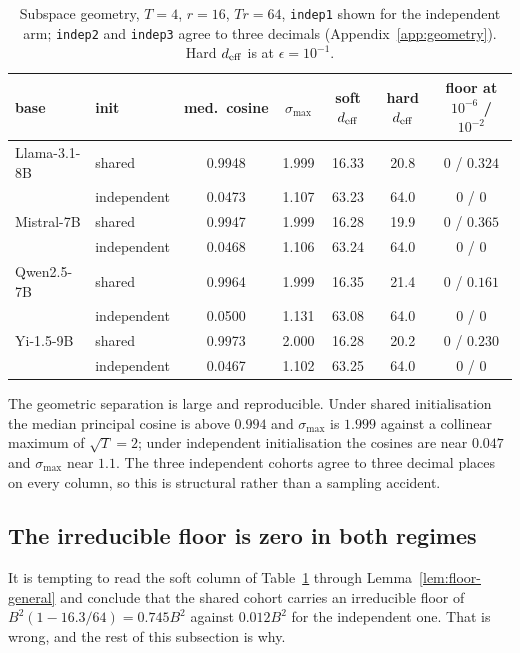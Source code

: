 \begin{table}[t]
\centering
\small
\caption{Subspace geometry, $T=4$, $r=16$, $Tr=64$, \texttt{indep1} shown for
the independent arm; \texttt{indep2} and \texttt{indep3} agree to three
decimals (Appendix~\ref{app:geometry}). Hard $d_{\mathrm{eff}}$ is at
$\epsilon = 10^{-1}$.}
\label{tab:geometry}
\begin{tabular}{llccccc}
\toprule
base & init & med.\ cosine & $\sigma_{\max}$ & soft $d_{\mathrm{eff}}$ & hard $d_{\mathrm{eff}}$
& floor at $10^{-6}$ / $10^{-2}$ \\
\midrule
Llama-3.1-8B  & shared      & 0.9948 & 1.999 & 16.33 & 20.8 & $0$ / $0.324$ \\
              & independent & 0.0473 & 1.107 & 63.23 & 64.0 & $0$ / $0$ \\
\addlinespace
Mistral-7B    & shared      & 0.9947 & 1.999 & 16.28 & 19.9 & $0$ / $0.365$ \\
              & independent & 0.0468 & 1.106 & 63.24 & 64.0 & $0$ / $0$ \\
\addlinespace
Qwen2.5-7B    & shared      & 0.9964 & 1.999 & 16.35 & 21.4 & $0$ / $0.161$ \\
              & independent & 0.0500 & 1.131 & 63.08 & 64.0 & $0$ / $0$ \\
\addlinespace
Yi-1.5-9B     & shared      & 0.9973 & 2.000 & 16.28 & 20.2 & $0$ / $0.230$ \\
              & independent & 0.0467 & 1.102 & 63.25 & 64.0 & $0$ / $0$ \\
\bottomrule
\end{tabular}
\end{table}

The geometric separation is large and reproducible. Under shared
initialisation the median principal cosine is above $0.994$ and
$\sigma_{\max}$ is $1.999$ against a collinear maximum of $\sqrt{T}=2$; under
independent initialisation the cosines are near $0.047$ and $\sigma_{\max}$
near $1.1$. The three independent cohorts agree to three decimal places on
every column, so this is structural rather than a sampling accident.

\subsection{The irreducible floor is zero in both regimes}
\label{subsec:floor-zero}

It is tempting to read the soft column of Table~\ref{tab:geometry} through
Lemma~\ref{lem:floor-general} and conclude that the shared cohort carries
an irreducible floor of $B^2(1 - 16.3/64) = 0.745B^2$ against $0.012B^2$
for the independent one. That is wrong, and the rest of this subsection is
why.

